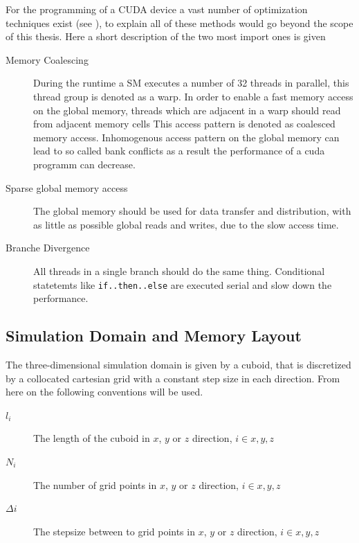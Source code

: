 For the programming of a CUDA device a vast number of optimization techniques exist (see \citep{CUDABP}),
to explain all of these methods would go beyond the scope of this thesis.
Here a short description of the two most import ones is given

\begin{description}
    \item[Memory Coalescing]
        During the runtime a SM executes a number of 32 threads in parallel, this thread group is denoted as a warp.
        In order to enable a fast memory access on the global memory, threads which are adjacent in a warp should read from adjacent memory cells
        This access pattern is denoted as coalesced memory access. Inhomogenous access pattern on the global memory can lead to so called bank
        conflicts as a result the performance of a cuda programm can decrease.

    \item[Sparse global memory access]
        The global memory should be used for data transfer and distribution, with as little as possible global reads and writes,
        due to the slow access time.

    \item[Branche Divergence]All threads in a single branch should do the same thing. Conditional statetemts like \texttt{if..then..else}
                              are executed serial and slow down the performance.
\end{description}


\subsection{Simulation Domain and  Memory Layout}

The three-dimensional simulation domain is given by a cuboid, that is discretized by a
collocated cartesian grid with a constant step size in each direction.
From here on the following conventions will be used.

\begin{description}
    \item[$l_i$] The length of the cuboid in $x$, $y$ or $z$ direction, $i\in{x, y, z}$
    \item[$N_i$] The number of grid points in $x$, $y$ or $z$ direction, $i\in{x, y, z}$
    \item[$\Delta i$] The stepsize between to grid points in $x$, $y$ or $z$ direction, $i\in{x, y, z}$
\end{description}

